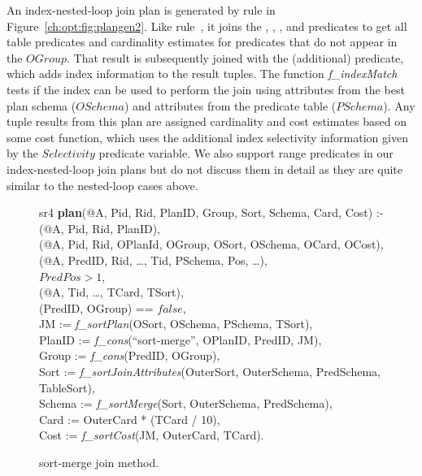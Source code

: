 An index-nested-loop join plan is generated by rule  in
Figure~\ref{ch:opt:fig:plangen2}.  Like rule~, it joins the
, , , and  predicates
to get all table predicates and cardinality estimates for predicates that do
not appear in the $OGroup$.  That result is subsequently joined with the
(additional)  predicate, which adds index information to the
result tuples.  The function {\em f\_indexMatch} tests if the index can be used
to perform the join using attributes from the best plan schema ($OSchema$) and
attributes from the predicate table ($PSchema$).  Any tuple results from this
plan are assigned cardinality and cost estimates based on some cost function,
which uses the additional index selectivity information given by the
$Selectivity$  predicate variable.  We also support range
predicates in our index-nested-loop join plans but do not discuss them in
detail as they are quite similar to the nested-loop cases above.

\begin{figure*}
\ssp
\centering
\begin{boxedminipage}{\linewidth}

sr4 {\bf plan}(@A, Pid, Rid, PlanID, Group, Sort, Schema, Card, Cost) :- \\
(@A, Pid, Rid, PlanID),\\
(@A, Pid, Rid, OPlanId, OGroup, OSort, OSchema, OCard, OCost), \\
(@A, PredID, Rid, \ldots, Tid, PSchema, Pos, \ldots), \\
\datalogspace $PredPos > 1$,\\
(@A, Tid, \ldots, TCard, TSort),\\
(PredID, OGroup) == $false$,\\
\datalogspace JM     := {\em f\_sortPlan}(OSort, OSchema, PSchema, TSort), \\
\datalogspace PlanID := {\em f\_cons}(``sort-merge'', OPlanID, PredID, JM), \\
\datalogspace Group  := {\em f\_cons}(PredID, OGroup), \\
\datalogspace Sort   := {\em f\_sortJoinAttributes}(OuterSort, OuterSchema, PredSchema, TableSort), \\  
\datalogspace Schema := {\em f\_sortMerge}(Sort, OuterSchema, PredSchema),\\
\datalogspace Card   := OuterCard * (TCard / 10),\\
\datalogspace Cost   := {\em f\_sortCost}(JM, OuterCard, TCard).

\end{boxedminipage}
\caption{\label{ch:opt:fig:plangen3}sort-merge join method.}
\end{figure*}

